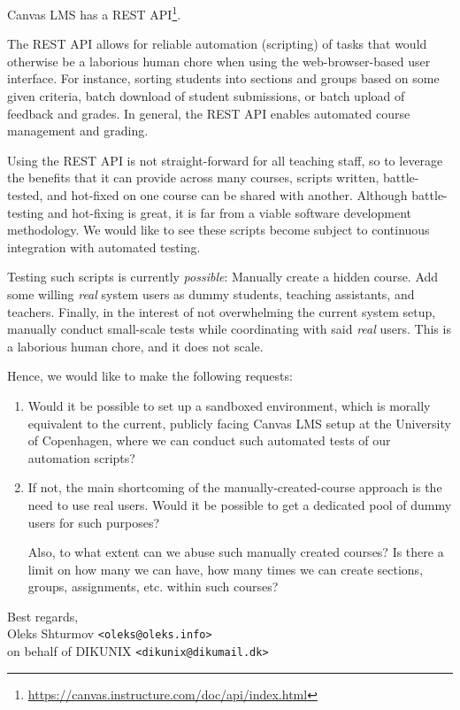 \documentclass[a4paper]{article}
\begin{document}
\maketitle

\pagestyle{empty}

\bigskip

Canvas LMS has a REST
API\footnote{\url{https://canvas.instructure.com/doc/api/index.html}}.

\bigskip

The REST API allows for reliable automation (scripting) of tasks that would
otherwise be a laborious human chore when using the web-browser-based user
interface.  For instance, sorting students into sections and groups based on
some given criteria, batch download of student submissions, or batch upload of
feedback and grades. In general, the REST API enables automated course
management and grading.

Using the REST API is not straight-forward for all teaching staff, so to
leverage the benefits that it can provide across many courses, scripts written,
battle-tested, and hot-fixed on one course can be shared with another. Although
battle-testing and hot-fixing is great, it is far from a viable software
development methodology. We would like to see these scripts become subject to
continuous integration with automated testing.

Testing such scripts is currently \emph{possible}: Manually create a hidden
course. Add some willing \emph{real} system users as dummy students, teaching
assistants, and teachers. Finally, in the interest of not overwhelming the
current system setup, manually conduct small-scale tests while coordinating
with said \emph{real} users. This is a laborious human chore, and it does not
scale.

Hence, we would like to make the following requests:

\begin{enumerate}

\item Would it be possible to set up a sandboxed environment, which is morally
equivalent to the current, publicly facing Canvas LMS setup at the University
of Copenhagen, where we can conduct such automated tests of our automation
scripts?

\item If not, the main shortcoming of the manually-created-course approach is
the need to use real users. Would it be possible to get a dedicated pool of
dummy users for such purposes?

Also, to what extent can we abuse such manually created courses? Is there a
limit on how many we can have, how many times we can create sections, groups,
assignments, etc. within such courses?

\end{enumerate}

\medskip

\begin{flushright}

Best regards,\\
Oleks Shturmov \texttt{<oleks@oleks.info>} \\
on behalf of DIKUNIX \texttt{<dikunix@dikumail.dk>}

\end{flushright}
\end{document}
